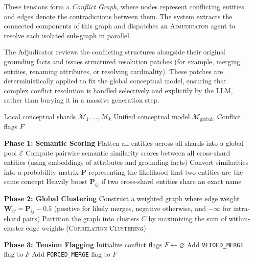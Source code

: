 These tensions form a \emph{Conflict Graph}, where nodes represent conflicting entities and edges denote the contradictions between them. The system extracts the connected components of this graph and dispatches an \textsc{Adjudicator} agent to resolve each isolated sub-graph in parallel. 

The Adjudicator reviews the conflicting structures alongside their original grounding facts and issues structured resolution patches (for example, merging entities, renaming attributes, or resolving cardinality). These patches are deterministically applied to fix the global conceptual model, ensuring that complex conflict resolution is handled selectively and explicitly by the LLM, rather than burying it in a massive generation step.

\begin{algorithm}[t]
\caption{Multi-Verse Correlation Clustering}
\label{alg:merge}
\begin{algorithmic}[1]
  \Require Local conceptual shards $\mathcal{M}_1, \dots, \mathcal{M}_k$
  \Ensure Unified conceptual model $\mathcal{M}_{\text{global}}$, Conflict flags $F$
  
  \State \textbf{Phase 1: Semantic Scoring}
  \State Flatten all entities across all shards into a global pool $\mathcal{E}$
  \State Compute pairwise semantic similarity scores between all cross-shard entities (using embeddings of attributes and grounding facts)
  \State Convert similarities into a probability matrix $\mathbf{P}$ representing the likelihood that two entities are the same concept
  \State Heavily boost $\mathbf{P}_{ij}$ if two cross-shard entities share an exact name
  
  \State \textbf{Phase 2: Global Clustering}
  \State Construct a weighted graph where edge weight $\mathbf{W}_{ij} = \mathbf{P}_{ij} - 0.5$ (positive for likely merges, negative otherwise, and $-\infty$ for intra-shard pairs)
  \State Partition the graph into clusters $C$ by maximizing the sum of within-cluster edge weights (\textsc{Correlation Clustering})
  
  \State \textbf{Phase 3: Tension Flagging}
  \State Initialize conflict flags $F \gets \varnothing$
      \State Add \texttt{VETOED\_MERGE} flag to $F$
      \State Add \texttt{FORCED\_MERGE} flag to $F$
    \EndIf
  \EndFor
  

\end{algorithmic}
\end{algorithm}
